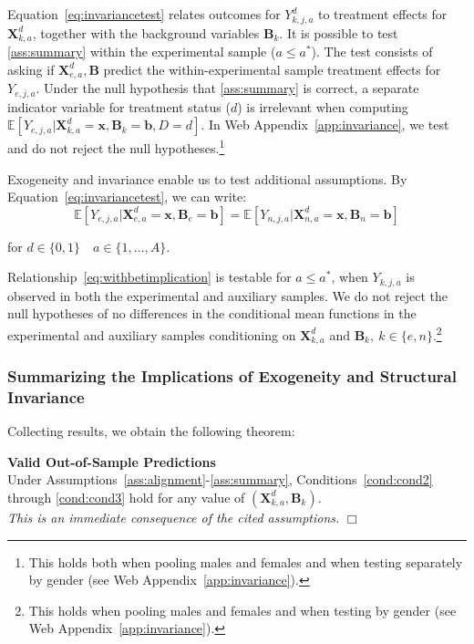 Equation~\eqref{eq:invariancetest} relates outcomes for $Y_{k,j,a}^d$ to treatment effects for $\bm{X}_{k,a}^d$, together with the background variables $\bm{B}_k$. It is possible to test \ref{ass:summary} within the experimental sample ($a \leq a^*$). The test consists of asking if $\bm{X}_{e,a}^d, \bm{B}$ predict the within-experimental sample treatment effects for $Y_{e,j,a}$. Under the null hypothesis that \ref{ass:summary} is correct, a separate indicator variable for treatment status ($d$) is irrelevant when computing $\mathbb{E} \left[ Y_{e,j,a} | \bm{X}_{k,a}^d  = \bm{x}, \bm{B}_k =  \bm{b}, D = d \right]$. In Web Appendix~\ref{app:invariance}, we test and do not reject the null hypotheses.\footnote{This holds both when pooling males and females and when testing separately by gender (see Web Appendix~\ref{app:invariance}).}

Exogeneity and invariance enable us to test additional assumptions. By Equation~\eqref{eq:invariancetest}, we can write:
\begin{equation}\label{eq:withbetimplication}
\mathbb{E} \left[ Y_{e,j,a} | \bm{X}^d_{e,a} = \bm{x}, \bm{B}_e = \bm{b} \right] = \mathbb{E} \left[ Y_{n,j,a} | \bm{X}^d_{n,a} = \bm{x}, \bm{B}_n = \bm{b} \right]
\end{equation}

\noindent for $d \in \{0,1\} \quad  a \in \{1,\dots,A\}$.

Relationship~\eqref{eq:withbetimplication} is testable for $a \leq a^*$, when $Y_{k,j,a}$ is observed in both the experimental and auxiliary samples. We do not reject the null hypotheses of no differences in the conditional mean functions in the experimental and auxiliary samples conditioning on $\bm{X}_{k,a}^d$ and $\bm{B}_k, \: k \in \{e,n\}$.\footnote{This holds when pooling males and females and when testing by gender (see Web Appendix~\ref{app:invariance}).}


\subsubsection{Summarizing the Implications of Exogeneity and Structural Invariance}

Collecting results, we obtain the following theorem:

\onehalfspacing
\setcounter{theorem}{0}
\begin{theorem}\label{theorem:main} \textbf{Valid Out-of-Sample Predictions} \\
Under Assumptions~\ref{ass:alignment}-\ref{ass:summary}, Conditions~\ref{cond:cond2} through \ref{cond:cond3} hold for any value of $\left( \bm{X}^d_{k,a}, \bm{B}_k \right)$. \\
\emph{This is an immediate consequence of the cited assumptions.} $\Box$
\end{theorem}
\doublespacing

